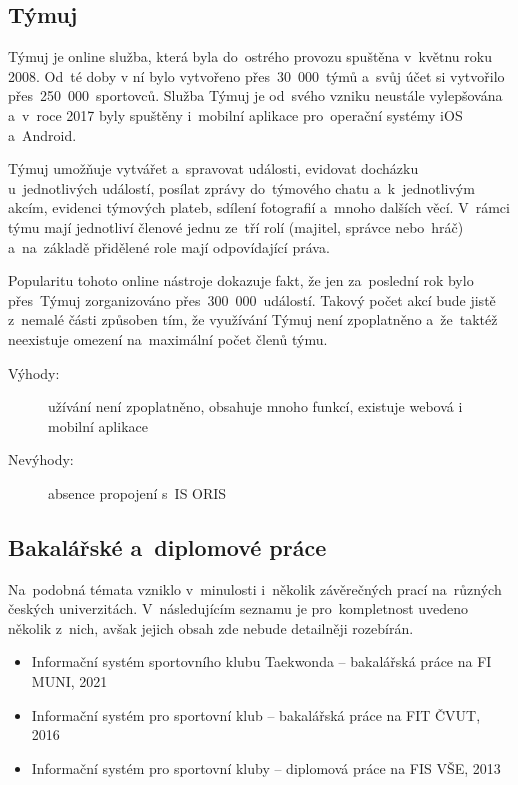 \subsection{Týmuj}
Týmuj je online služba, která byla do~ostrého provozu spuštěna v~květnu roku 2008. Od~té doby v ní bylo vytvořeno přes~30~000~týmů a~svůj účet si vytvořilo přes~250~000~sportovců. Služba Týmuj je od~svého vzniku neustále vylepšována a~v~roce 2017 byly spuštěny i~mobilní aplikace pro~operační systémy iOS a~Android.

Týmuj umožňuje vytvářet a~spravovat události, evidovat docházku u~jednotlivých událostí, posílat zprávy do~týmového chatu a~k~jednotlivým akcím, evidenci týmových plateb, sdílení fotografií a~mnoho dalších věcí. V~rámci týmu mají jednotliví členové jednu ze~tří rolí (majitel, správce nebo~hráč) a~na~základě přidělené role mají odpovídající práva.

Popularitu tohoto online nástroje dokazuje fakt, že jen za~poslední rok bylo přes~Týmuj zorganizováno přes~300~000~událostí. Takový počet akcí bude jistě z~nemalé části způsoben tím, že využívání Týmuj není zpoplatněno a~že~taktéž neexistuje omezení na~maximální počet členů týmu. \cite{tymuj}

\begin{description}
	\item[Výhody:] užívání není zpoplatněno, obsahuje mnoho funkcí, existuje webová i mobilní aplikace
	\item[Nevýhody:] absence propojení s~IS ORIS
\end{description}

\subsection{Bakalářské a~diplomové práce}
Na~podobná témata vzniklo v~minulosti i~několik závěrečných prací na~různých českých univerzitách. V~následujícím seznamu je pro~kompletnost uvedeno několik z~nich, avšak jejich obsah zde nebude detailněji rozebírán.

\begin{itemize}
	\item Informační systém sportovního klubu Taekwonda – bakalářská práce na FI MUNI, 2021 \cite{fimuni2021}
	\item Informační systém pro sportovní klub – bakalářská práce na FIT ČVUT, 2016 \cite{fitcvut2016}
	\item Informační systém pro sportovní kluby – diplomová práce na FIS VŠE, 2013 \cite{fisvse2013}
\end{itemize}
